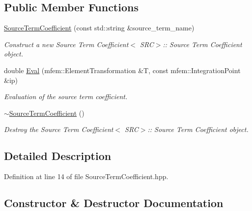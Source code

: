 \subsection*{Public Member Functions}
\begin{DoxyCompactItemize}
\item 
\mbox{\label{classSourceTermCoefficient_ac186818e550416624ef7acb98c2d622a}} 
\hyperlink{classSourceTermCoefficient_ac186818e550416624ef7acb98c2d622a}{Source\+Term\+Coefficient} (const std\+::string \&source\+\_\+term\+\_\+name)
\begin{DoxyCompactList}\small\item\em Construct a new Source Term Coefficient$<$ S\+R\+C$>$\+:\+: Source Term Coefficient object. \end{DoxyCompactList}\item 
double \hyperlink{classSourceTermCoefficient_a194d078c44616aff71a9266dfe988efc}{Eval} (mfem\+::\+Element\+Transformation \&T, const mfem\+::\+Integration\+Point \&ip)
\begin{DoxyCompactList}\small\item\em Evaluation of the source term coefficient. \end{DoxyCompactList}\item 
\hyperlink{classSourceTermCoefficient_a600201256c7b7358651c38cd08fd24c2}{$\sim$\+Source\+Term\+Coefficient} ()
\begin{DoxyCompactList}\small\item\em Destroy the Source Term Coefficient$<$ S\+R\+C$>$\+:\+: Source Term Coefficient object. \end{DoxyCompactList}\end{DoxyCompactItemize}


\subsection{Detailed Description}


Definition at line 14 of file Source\+Term\+Coefficient.\+hpp.



\subsection{Constructor \& Destructor Documentation}
\mbox{\label{classSourceTermCoefficient_a600201256c7b7358651c38cd08fd24c2}} 
